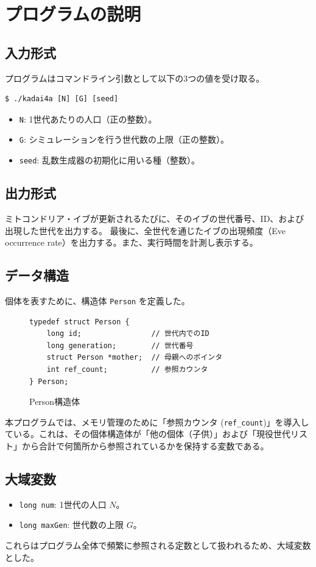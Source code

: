 \documentclass[a4paper,11pt]{jsarticle}
\begin{document}
\section{プログラムの説明}

\subsection{入力形式}
プログラムはコマンドライン引数として以下の3つの値を受け取る。
\begin{verbatim}
$ ./kadai4a [N] [G] [seed]
\end{verbatim}
\begin{itemize}
    \item \texttt{N}: 1世代あたりの人口（正の整数）。
    \item \texttt{G}: シミュレーションを行う世代数の上限（正の整数）。
    \item \texttt{seed}: 乱数生成器の初期化に用いる種（整数）。
\end{itemize}

\subsection{出力形式}
ミトコンドリア・イブが更新されるたびに、そのイブの世代番号、ID、および出現した世代を出力する。
最後に、全世代を通じたイブの出現頻度（Eve occurrence rate）を出力する。また、実行時間を計測し表示する。

\subsection{データ構造}
個体を表すために、構造体 \texttt{Person} を定義した。

\begin{figure}[h]
\centering
\caption{Person構造体}
\begin{verbatim}
typedef struct Person {
    long id;                // 世代内でのID
    long generation;        // 世代番号
    struct Person *mother;  // 母親へのポインタ
    int ref_count;          // 参照カウンタ
} Person;
\end{verbatim}
\end{figure}

本プログラムでは、メモリ管理のために「参照カウンタ (\texttt{ref\_count})」を導入している。これは、その個体構造体が「他の個体（子供）」および「現役世代リスト」から合計で何箇所から参照されているかを保持する変数である。

\subsection{大域変数}
\begin{itemize}
    \item \texttt{long num}: 1世代の人口 $N$。
    \item \texttt{long maxGen}: 世代数の上限 $G$。
\end{itemize}
これらはプログラム全体で頻繁に参照される定数として扱われるため、大域変数とした。
\end{document}
